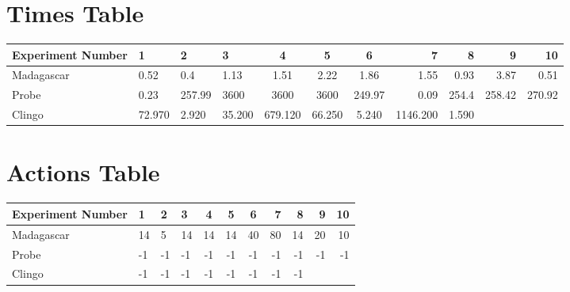 \documentclass[8pt]{article}
\begin{document}
\begin{landscape}
\section{Times Table}\begin{tabular}{ | l | l | l | l | c | c | c | r | r | r | r | }\hline
Experiment Number & 1 & 2 & 3 & 4 & 5 & 6 & 7 & 8 & 9 & 10\\  \hline
Madagascar & 0.52 & 0.4 & 1.13 & 1.51 & 2.22 & 1.86 & 1.55 & 0.93 & 3.87 & 0.51\\  \hline
Probe & 0.23 & 257.99 & 3600 & 3600 & 3600 & 249.97 & 0.09 & 254.4 & 258.42 & 270.92\\  \hline
Clingo & 72.970 & 2.920 & 35.200 & 679.120 & 66.250 & 5.240 & 1146.200 & 1.590\\ \hline
\end{tabular}
\section{Actions Table}\begin{tabular}{ | l | l | l | l | c | c | c | r | r | r | r | }\hline
Experiment Number & 1 & 2 & 3 & 4 & 5 & 6 & 7 & 8 & 9 & 10\\ \hline
 Madagascar & 14 & 5 & 14 & 14 & 14 & 40 & 80 & 14 & 20 & 10\\ \hline
 Probe & -1 & -1 & -1 & -1 & -1 & -1 & -1 & -1 & -1 & -1\\ \hline
 Clingo & -1 & -1 & -1 & -1 & -1 & -1 & -1 & -1\\ \hline
\end{tabular}
\end{landscape}
\end{document}
